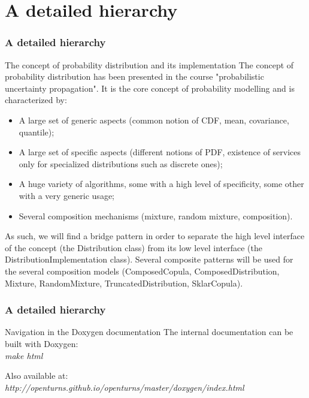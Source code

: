 \documentclass[8pt]{beamer}
\begin{document}
\section[A detailed hierarchy]{A detailed hierarchy}
\begin{frame}
  \frametitle{A detailed hierarchy}
  \begin{block}{The concept of probability distribution and its implementation}
    The concept of probability distribution has been presented in the course "probabilistic uncertainty propagation". It is the core concept of probability modelling and is characterized by:
    \begin{itemize}
    \item A large set of generic aspects (common notion of CDF, mean, covariance, quantile);
    \item A large set of specific aspects (different notions of PDF, existence of services only for specialized distributions such as discrete ones);
    \item A huge variety of algorithms, some with a high level of specificity, some other with a very generic usage;
    \item Several composition mechanisms (mixture, random mixture, composition).
    \end{itemize}
  \end{block}
  As such, we will find a bridge pattern in order to separate the \alert{high level interface} of the concept (the \alert{Distribution class}) from its \alert{low level interface} (the \alert{DistributionImplementation class}). Several composite patterns will be used for the several composition models (ComposedCopula, ComposedDistribution, Mixture, RandomMixture, TruncatedDistribution, SklarCopula).
\end{frame}
\begin{frame}
  \frametitle{A detailed hierarchy}
  \begin{block}{Navigation in the Doxygen documentation}
    The internal documentation can be built with Doxygen:\\
    \textit{make html}

    Also available at:\\
    \textit{http://openturns.github.io/openturns/master/doxygen/index.html}
  \end{block}
\end{frame}
\end{document}
